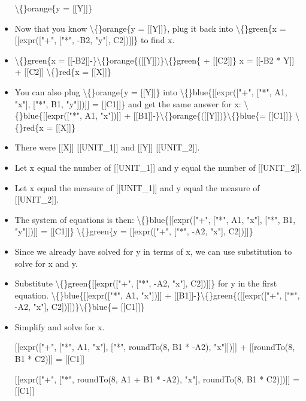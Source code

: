 \documentclass{article}
\begin{document}
\begin{itemize}
                        \textbackslash\{\}orange\{y = [[Y]]\}
  \item Now that you know \textbackslash\{\}orange\{y = [[Y]]\}, plug it back into \textbackslash\{\}green\{x = [[expr(["+", ["*", -B2, "y"], C2])]]\} to find x.
  \item \textbackslash\{\}green\{x = [[-B2]]-\}\textbackslash\{\}orange\{([[Y]])\}\textbackslash\{\}green\{ + [[C2]]\}
                        x = [[-B2 * Y]] + [[C2]]
                        \textbackslash\{\}red\{x = [[X]]\}
  \item You can also plug \textbackslash\{\}orange\{y = [[Y]]\} into \textbackslash\{\}blue\{[[expr(["+", ["*", A1, "x"], ["*", B1, "y"]])]] = [[C1]]\} and get the same answer for x:
                        \textbackslash\{\}blue\{[[expr(["*", A1, "x"])]] + [[B1]]-\}\textbackslash\{\}orange\{([[Y]])\}\textbackslash\{\}blue\{= [[C1]]\}
                        \textbackslash\{\}red\{x = [[X]]\}
  \item There were [[X]] [[UNIT\_1]] and [[Y]] [[UNIT\_2]].
  \item Let x equal the number of [[UNIT\_1]] and y equal the number of [[UNIT\_2]].
  \item Let x equal the measure of [[UNIT\_1]] and y equal the measure of [[UNIT\_2]].
  \item The system of equations is then:
                        \textbackslash\{\}blue\{[[expr(["+", ["*", A1, "x"], ["*", B1, "y"]])]] = [[C1]]\}
                        \textbackslash\{\}green\{y = [[expr(["+", ["*", -A2, "x"], C2])]]\}
  \item Since we already have solved for y in terms of x, we can use substitution to solve for x and y.
  \item Substitute \textbackslash\{\}green\{[[expr(["+", ["*", -A2, "x"], C2])]]\} for y in the first equation.
                        \textbackslash\{\}blue\{[[expr(["*", A1, "x"])]] + [[B1]]-\}\textbackslash\{\}green\{([[expr(["+", ["*", -A2, "x"], C2])]])\}\textbackslash\{\}blue\{= [[C1]]\}
  \item Simplify and solve for x.
                        
                            [[expr(["+", ["*", A1, "x"], ["*", roundTo(8, B1 * -A2), "x"]])]] + [[roundTo(8, B1 * C2)]] = [[C1]]
                        
                        
                            [[expr(["+", ["*", roundTo(8, A1 + B1 * -A2), "x"], roundTo(8, B1 * C2)])]] = [[C1]]
                        

\end{itemize}
\end{document}

